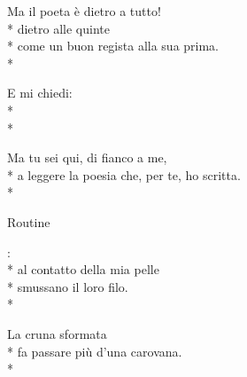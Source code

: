 \documentclass[12pt]{book}
\begin{document}
\begin{poem}{}{}
\begin{altverse}
Ma il poeta è dietro a tutto! \\*
dietro alle quinte \\*
come un buon regista alla sua prima. \\*
\end{altverse}

\begin{altverse}
E mi chiedi: \\*
 \\*
\end{altverse}

\begin{altverse}
Ma tu sei qui, di fianco a me, \\*
a leggere la poesia che, per te, ho scritta. \\*
\end{altverse}


\end{poem}

\begin{poem}{Routine}{}

\settowidth{\versewidth}{non meno è ciò che meriti.}

\begin{altverse}
:\\*
al contatto della mia pelle \\*
smussano il loro filo. \\*
\end{altverse}


\begin{altverse}
La cruna sformata \\*
fa passare più d'una carovana. \\*
\end{altverse}


\end{poem}
\end{document}

